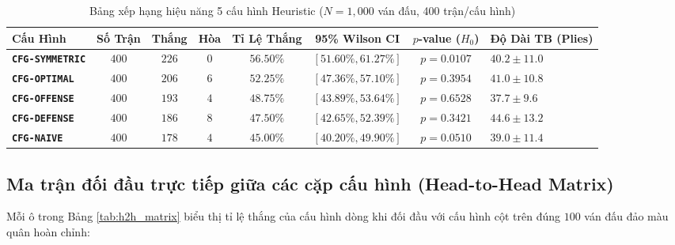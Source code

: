 \documentclass[11pt,a4paper]{article}
\begin{document}
\begin{table}[htbp]
\centering
\small
\caption{Bảng xếp hạng hiệu năng 5 cấu hình Heuristic ($N = 1{,}000$ ván đấu, 400 trận/cấu hình)}
\label{tab:profile_standings}
\begin{tabularx}{\textwidth}{l c c c c c c X}
\toprule
\textbf{Cấu Hình} & \textbf{Số Trận} & \textbf{Thắng} & \textbf{Hòa} & \textbf{Tỉ Lệ Thắng} & \textbf{95\% Wilson CI} & \textbf{$p$-value ($H_0$)} & \textbf{Độ Dài TB (Plies)} \\
\midrule
\textbf{\texttt{CFG-SYMMETRIC}} & $400$ & \textbf{$226$} & $0$ & \textbf{$56.50\%$} & $[51.60\%, 61.27\%]$ & \textbf{$p = 0.0107$} & $40.2 \pm 11.0$ \\
\textbf{\texttt{CFG-OPTIMAL}}   & $400$ & $206$ & $6$ & \textbf{$52.25\%$} & $[47.36\%, 57.10\%]$ & $p = 0.3954$ & $41.0 \pm 10.8$ \\
\textbf{\texttt{CFG-OFFENSE}}   & $400$ & $193$ & $4$ & $48.75\%$ & $[43.89\%, 53.64\%]$ & $p = 0.6528$ & \textbf{$37.7 \pm 9.6$} \\
\textbf{\texttt{CFG-DEFENSE}}   & $400$ & $186$ & $8$ & $47.50\%$ & $[42.65\%, 52.39\%]$ & $p = 0.3421$ & \textbf{$44.6 \pm 13.2$} \\
\textbf{\texttt{CFG-NAIVE}}     & $400$ & $178$ & $4$ & \textbf{$45.00\%$} & $[40.20\%, 49.90\%]$ & $p = 0.0510$ & $39.0 \pm 11.4$ \\
\bottomrule
\end{tabularx}
\end{table}

\subsection{Ma trận đối đầu trực tiếp giữa các cặp cấu hình (Head-to-Head Matrix)}
Mỗi ô trong Bảng \ref{tab:h2h_matrix} biểu thị tỉ lệ thắng của cấu hình dòng khi đối đầu với cấu hình cột trên đúng $100$ ván đấu đảo màu quân hoàn chỉnh:
\end{document}
